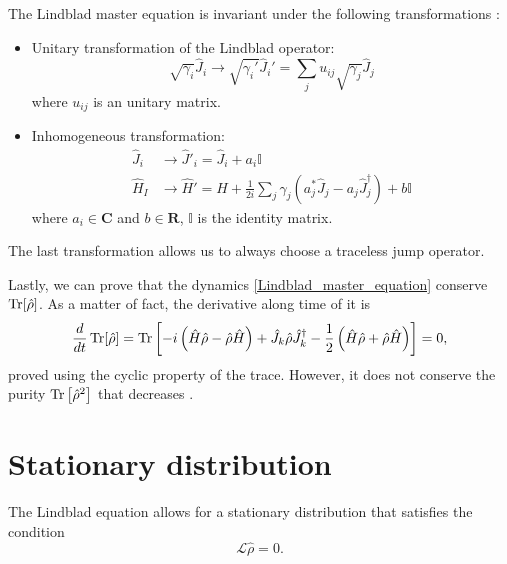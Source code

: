 The Lindblad master equation is invariant under the following transformations \cite{Breuer-Petruccione}:
\begin{itemize}
    \item Unitary transformation of the Lindblad operator:
        \begin{equation}
            \sqrt{\gamma_i}\hat J_i \rightarrow \sqrt{\gamma_i'}\hat J_i' = \sum_j u_{ij}\sqrt{\gamma_j}\hat J_j
        \end{equation}
        where $u_{ij}$ is an unitary matrix.
    \item Inhomogeneous transformation:
        \begin{equation}
            \begin{split}
                \hat J_i &\rightarrow \hat J'_i = \hat J_i + a_i\mathbb{I}\\
                \hat H_I &\rightarrow \hat H' = \hat H + \frac{1}{2i}\sum_j\gamma_j\left(a^*_j\hat J_j -a_j\hat J_j^\dagger\right) + b \mathbb{I}
            \end{split}
        \end{equation}
        where $a_i \in\mathbf{C}$ and $b \in \mathbf{R}$, $\mathbb{I}$ is the identity matrix.
\end{itemize}
The last transformation allows us to always choose a traceless jump operator.

Lastly, we can prove that the dynamics \eqref{Lindblad_master_equation} conserve $\operatorname{Tr}[\hat\rho]$. As a matter of fact, the derivative along time of it is
\begin{equation}\label{Lindblad_master_equation}
    \frac{d}{dt}\operatorname{Tr}[\hat\rho] = \operatorname{Tr}\left[-i\left(\hat H\hat\rho - \hat\rho\hat H \right) +  \hat J_k \hat\rho \hat J_k^\dagger -\frac{1}{2} \left(\hat H\hat\rho + \hat\rho\hat H\right)\right] = 0,
\end{equation}
proved using the cyclic property of the trace. 
However, it does not conserve the purity $\operatorname{Tr}\left[\hat\rho^2\right]$ that decreases \cite{Manzano}. 



\section{Stationary distribution}
The Lindblad equation allows for a stationary distribution that satisfies the condition
\begin{equation}
    \mathcal{L}\hat\rho = 0.
\end{equation}

